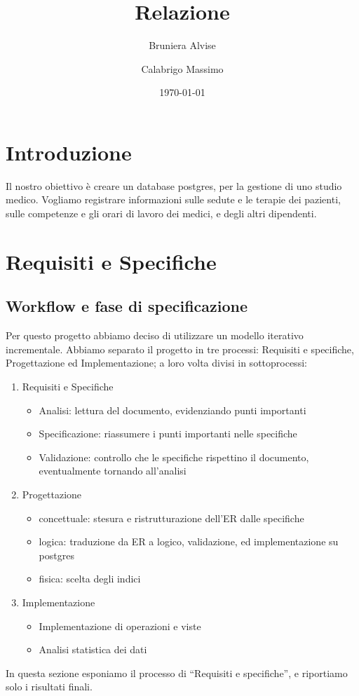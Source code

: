 \documentclass[11pt]{article}
\title{Relazione}
\author{Bruniera Alvise\and Calabrigo Massimo}
\affil{Università degli studi di Udine}
\date{\today}
\begin{document}
\maketitle

\tableofcontents
\section{Introduzione}
Il nostro obiettivo è creare un database postgres, per la gestione di uno studio medico.
Vogliamo registrare informazioni sulle sedute e le terapie dei pazienti, sulle competenze e gli orari di lavoro dei medici, e degli altri dipendenti.
\section{Requisiti e Specifiche}

\subsection{Workflow e fase di specificazione}
Per questo progetto abbiamo deciso di utilizzare un modello iterativo incrementale.
Abbiamo separato il progetto in tre processi: Requisiti e specifiche, Progettazione ed Implementazione;
a loro volta divisi in sottoprocessi:
\begin{enumerate}
    \item Requisiti e Specifiche
    \begin{itemize}
        \item Analisi: lettura del documento, evidenziando punti importanti
        \item Specificazione: riassumere i punti importanti nelle specifiche
        \item Validazione: controllo che le specifiche rispettino il documento, eventualmente tornando all'analisi
    \end{itemize}
    \item Progettazione
    \begin{itemize}
        \item concettuale: stesura e ristrutturazione dell'ER dalle specifiche
        \item logica: traduzione da ER a logico, validazione, ed implementazione su postgres
        \item fisica: scelta degli indici
    \end{itemize}
    \item Implementazione
    \begin{itemize}
        \item Implementazione di operazioni e viste
        \item Analisi statistica dei dati
    \end{itemize}
\end{enumerate}
In questa sezione esponiamo il processo di ``Requisiti e specifiche'', e riportiamo
solo i risultati finali.
\end{document}
